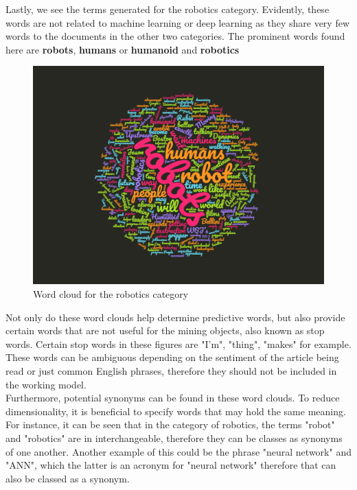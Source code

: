 Lastly, we see the terms generated for the robotics category. Evidently, these words are not related to machine learning or deep learning as they share very few words to the documents in the other two categories. The prominent words found here are \textbf{robots}, \textbf{humans} or \textbf{humanoid} and  \textbf{robotics}

\newpage


\begin{figure}[ht]
	\begin{center}
		\advance\leftskip-3cm
		\advance\rightskip-3cm
		\includegraphics[keepaspectratio=true,scale=0.4]{__resources/robotics.png}
		\caption{Word cloud for the robotics category}
		\label{robfig}
	\end{center}
\end{figure}


Not only do these word clouds help determine predictive words, but also provide certain words that are not useful for the mining objects, also known as stop words. Certain stop words in these figures are "I'm", "thing",  "makes" for example. These words can be ambiguous depending on the sentiment of the article being read or just common English phrases, therefore they should not be included in the working model. \\
Furthermore, potential synonyms can be found in these word clouds. To reduce dimensionality, it is beneficial to specify words that may hold the same meaning. For instance, it can be seen that in the category of robotics, the terms "robot" and "robotics" are in interchangeable, therefore they can be classes as synonyms of one another. Another example of this could be the phrase "neural network" and "ANN", which the latter is an acronym for "neural network" therefore that can also be classed as a synonym.

